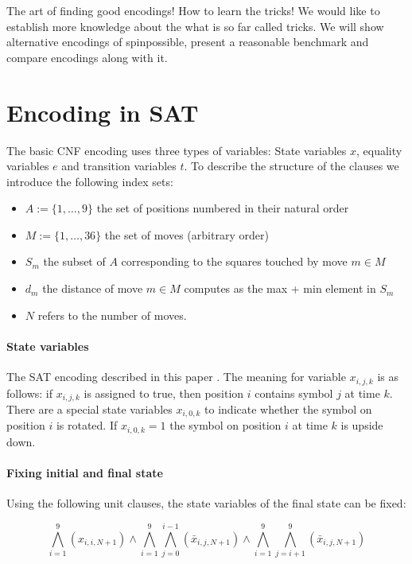 \documentclass[]{llncs}
\begin{document}
The art of finding good encodings! How to learn the tricks! We would like to establish more knowledge about the what is
so far called  tricks.  We will show alternative encodings of spinpossible, present a reasonable benchmark and compare
encodings along with it.

\section{Encoding in SAT}

The basic CNF encoding uses three types of variables: State variables $x$, equality variables $e$ and transition
variables $t$. To describe the structure of the clauses we introduce the following index sets:

\begin{itemize}
\item $A := \{1,\dots,9\}$ the set of positions numbered in their natural order
\item $M := \{1,\dots,36\}$ the set of moves (arbitrary order)
\item $S_m$ the subset of $A$ corresponding to the squares touched by move $m \in M$
\item $d_m$ the distance of move $m \in M$ computes as the max + min element in $S_m$
\item $N$ refers to the number of moves.

\end{itemize}

\paragraph{State variables} The SAT encoding described in this paper . The meaning for variable $x_{i,j,k}$ is as
follows: if $x_{i,j,k}$ is assigned to true, then position $i$ contains symbol $j$ at time $k$.  There are a special state
variables $x_{i,0,k}$ to indicate whether the symbol on position $i$ is rotated. If $x_{i,0,k} = 1$ the symbol on position
$i$ at time $k$ is upside down.  

\paragraph{Fixing initial and final state} Using the following unit clauses, the state variables of the final state can
be fixed:

\begin{equation}
\bigwedge_{i=1}^9  (x_{i,i,N+1}) \land \bigwedge_{i=1}^9 \bigwedge_{j=0}^{i-1} (\bar x_{i,j ,N+1}) \land
\bigwedge_{i=1}^9 \bigwedge_{j=i+1}^{9} (\bar x_{i,j ,N+1})
\end{equation}
\end{document}
